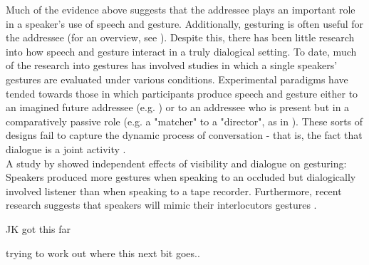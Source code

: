 \documentclass[a4paper,man,natbib]{apa6}
\begin{document}
Much of the evidence above suggests that the addressee plays an important role in a speaker's use of speech and gesture.
Additionally, gesturing is often useful for the addressee (for an overview, see \citet{Hostetter2011}). 
Despite this, there has been little research into how speech and gesture interact in a truly dialogical setting.
To date, much of the research into gestures has involved studies in which a single speakers' gestures are evaluated under various conditions.
Experimental paradigms have tended towards those in which participants produce speech and gesture either to an imagined future addressee (e.g. \citet{Wesp2001, Morsella2004}) or to an addressee who is present but in a comparatively passive role (e.g. a "matcher" to a "director", as in \citet{Bangerter2004, Holler2007, DeRuiter2012, Hoetjes2015}).
These sorts of designs fail to capture the dynamic process of conversation - that is, the fact that dialogue is a joint activity \citep{Clark1996}.\\

A study by \citeauthor{Bavelas2008} showed independent effects of visibility and dialogue on gesturing:
Speakers produced more gestures when speaking to an occluded but dialogically involved listener than when speaking to a tape recorder. 
Furthermore, recent research suggests that speakers will mimic their interlocutors gestures \citep{Kimbara2008, Holler2011}. %

\noindent\makebox[\linewidth]{\rule{\paperwidth}{0.4pt}}
JK got this far

\newpage
trying to work out where this next bit goes..
\end{document}
